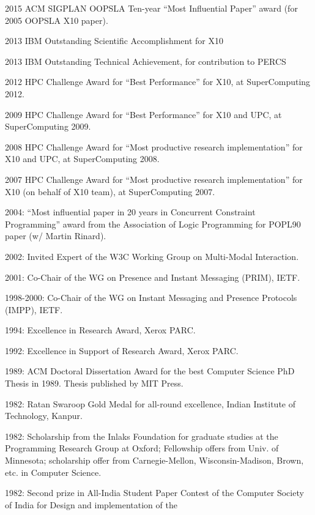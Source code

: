 \documentclass{article}
\begin{document}
\begin{description}
\item{2015} ACM SIGPLAN OOPSLA Ten-year ``Most Influential Paper'' award (for
  2005 OOPSLA X10 paper).
\item{2013} IBM Outstanding Scientific Accomplishment for X10
\item{2013} IBM Outstanding Technical Achievement, for contribution to PERCS
\item{2012} HPC Challenge Award for ``Best Performance'' for X10, at SuperComputing 2012.
\item{2009} HPC Challenge Award for ``Best Performance'' for X10 and UPC, at SuperComputing 2009.
\item{2008} HPC Challenge Award for ``Most productive research 
implementation'' for X10 and UPC, at SuperComputing
2008.
\item{2007} HPC Challenge Award for ``Most productive research
implementation'' for X10 (on behalf of X10 team), at SuperComputing
2007.
\item{2004:} ``Most influential paper in 20 years in Concurrent
Constraint Programming'' award from the Association of Logic
Programming for POPL90 paper (w/ Martin Rinard).
\item{2002:} Invited Expert of the W3C Working Group on Multi-Modal
Interaction.
\item{2001:} Co-Chair of the WG on Presence and Instant Messaging
(PRIM), IETF.
\item{1998-2000:} Co-Chair of the WG on Instant Messaging and
 Presence Protocols (IMPP), IETF.
\item{1994:} Excellence in Research Award, Xerox PARC.   
\item{1992:} Excellence in Support of Research Award, Xerox PARC.   
\item{1989:} ACM Doctoral Dissertation Award for the best Computer Science
   PhD Thesis in 1989. Thesis published by MIT Press.
\item{1982:} Ratan Swaroop Gold Medal for all-round excellence,
      Indian Institute of Technology, Kanpur. 
\item{1982:} Scholarship from the Inlaks Foundation for graduate studies
      at the Programming Research Group at Oxford; Fellowship
      offers from Univ. of  Minnesota; scholarship offer from 
      Carnegie-Mellon, Wisconsin-Madison, Brown, etc.  in
      Computer Science.  
\item{1982:} Second prize in All-India Student Paper Contest of the
      Computer Society of India for  Design and implementation of the

\end{description}
\end{document}
